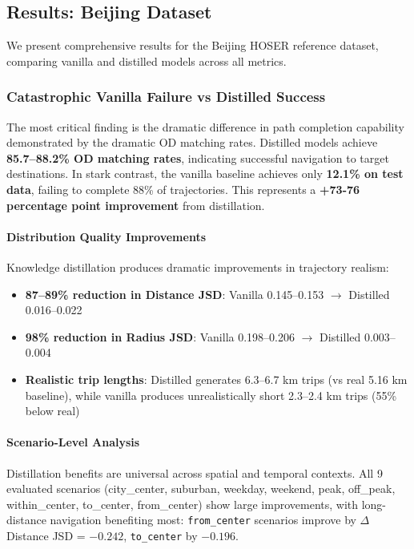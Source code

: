 \subsection{Results: Beijing Dataset}
\label{sec:eval-beijing}

We present comprehensive results for the Beijing HOSER reference dataset, comparing vanilla and distilled models across all metrics.

\subsubsection{Catastrophic Vanilla Failure vs Distilled Success}

The most critical finding is the dramatic difference in path completion capability demonstrated by the dramatic OD matching rates. Distilled models achieve \textbf{85.7--88.2\% OD matching rates}, indicating successful navigation to target destinations. In stark contrast, the vanilla baseline achieves only \textbf{12.1\% on test data}, failing to complete 88\% of trajectories. This represents a \textbf{+73-76 percentage point improvement} from distillation.

\paragraph{Distribution Quality Improvements}
Knowledge distillation produces dramatic improvements in trajectory realism:
\begin{itemize}[leftmargin=*,noitemsep]
    \item \textbf{87--89\% reduction in Distance JSD}: Vanilla 0.145--0.153 $\to$ Distilled 0.016--0.022
    \item \textbf{98\% reduction in Radius JSD}: Vanilla 0.198--0.206 $\to$ Distilled 0.003--0.004
    \item \textbf{Realistic trip lengths}: Distilled generates 6.3--6.7 km trips (vs real 5.16 km baseline), while vanilla produces unrealistically short 2.3--2.4 km trips (55\% below real)
\end{itemize}

\paragraph{Scenario-Level Analysis}
Distillation benefits are universal across spatial and temporal contexts. All 9 evaluated scenarios (city\_center, suburban, weekday, weekend, peak, off\_peak, within\_center, to\_center, from\_center) show large improvements, with long-distance navigation benefiting most: \texttt{from\_center} scenarios improve by $\Delta$ Distance JSD = $-0.242$, \texttt{to\_center} by $-0.196$.

